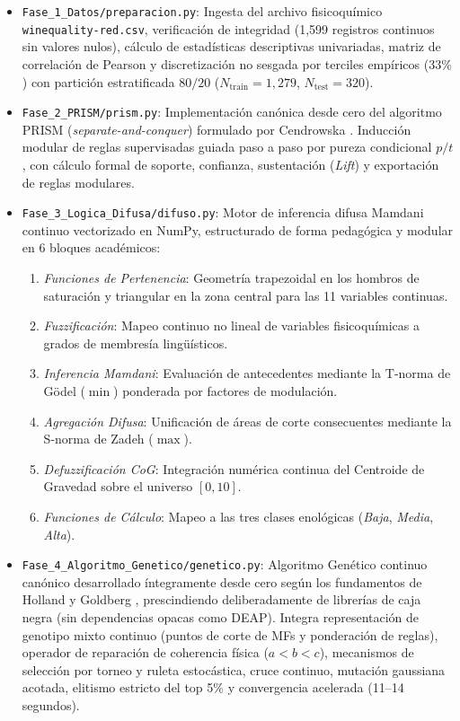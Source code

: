 \documentclass{article}
\begin{document}
\begin{itemize}
    \item \texttt{Fase\_1\_Datos/preparacion.py}: Ingesta del archivo fisicoquímico \texttt{winequality-red.csv}, verificación de integridad (1,599 registros continuos sin valores nulos), cálculo de estadísticas descriptivas univariadas, matriz de correlación de Pearson y discretización no sesgada por terciles empíricos ($33\%$) con partición estratificada $80/20$ ($N_{\text{train}} = 1,279$, $N_{\text{test}} = 320$).
    \item \texttt{Fase\_2\_PRISM/prism.py}: Implementación canónica desde cero del algoritmo PRISM (\textit{separate-and-conquer}) formulado por Cendrowska \cite{cendrowska1987prism}. Inducción modular de reglas supervisadas guiada paso a paso por pureza condicional $p/t$, con cálculo formal de soporte, confianza, sustentación (\textit{Lift}) y exportación de reglas modulares.
    \item \texttt{Fase\_3\_Logica\_Difusa/difuso.py}: Motor de inferencia difusa Mamdani continuo vectorizado en NumPy, estructurado de forma pedagógica y modular en 6 bloques académicos:
    \begin{enumerate}
        \item \textit{Funciones de Pertenencia}: Geometría trapezoidal en los hombros de saturación y triangular en la zona central para las 11 variables continuas.
        \item \textit{Fuzzificación}: Mapeo continuo no lineal de variables fisicoquímicas a grados de membresía lingüísticos.
        \item \textit{Inferencia Mamdani}: Evaluación de antecedentes mediante la T-norma de Gödel ($\min$) ponderada por factores de modulación.
        \item \textit{Agregación Difusa}: Unificación de áreas de corte consecuentes mediante la S-norma de Zadeh ($\max$).
        \item \textit{Defuzzificación CoG}: Integración numérica continua del Centroide de Gravedad sobre el universo $[0, 10]$.
        \item \textit{Funciones de Cálculo}: Mapeo a las tres clases enológicas (\textit{Baja}, \textit{Media}, \textit{Alta}).
    \end{enumerate}
    \item \texttt{Fase\_4\_Algoritmo\_Genetico/genetico.py}: Algoritmo Genético continuo canónico desarrollado íntegramente desde cero según los fundamentos de Holland \cite{holland1975adaptation} y Goldberg \cite{goldberg1989genetic}, prescindiendo deliberadamente de librerías de caja negra (sin dependencias opacas como DEAP). Integra representación de genotipo mixto continuo (puntos de corte de MFs y ponderación de reglas), operador de reparación de coherencia física ($a < b < c$), mecanismos de selección por torneo y ruleta estocástica, cruce continuo, mutación gaussiana acotada, elitismo estricto del top 5\% y convergencia acelerada (11--14 segundos).

\end{itemize}
\end{document}
